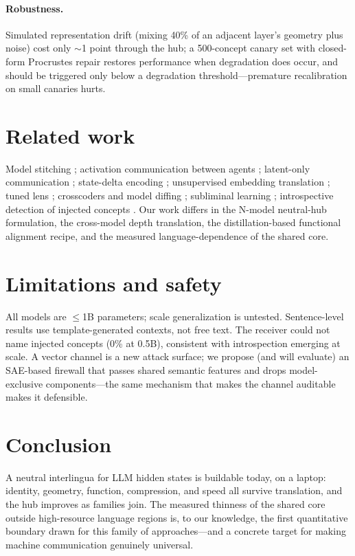 \documentclass[11pt]{article}
\begin{document}
\paragraph{Robustness.} Simulated representation drift (mixing 40\% of an
adjacent layer's geometry plus noise) cost only $\sim$1 point through the
hub; a 500-concept canary set with closed-form Procrustes repair restores
performance when degradation does occur, and should be triggered only below
a degradation threshold---premature recalibration on small canaries hurts.

\section{Related work}
Model stitching \cite{lenc2015,bansal2021}; activation communication between
agents \cite{ramesh2025activations}; latent-only communication
\cite{interlat2026}; state-delta encoding \cite{sde2025}; unsupervised
embedding translation \cite{jha2025vec2vec}; tuned lens \cite{belrose2023};
crosscoders and model diffing \cite{anthropic2025crosscoders}; subliminal
learning \cite{cloud2025subliminal}; introspective detection of injected
concepts \cite{lindsey2025introspection}. Our work differs in the N-model
neutral-hub formulation, the cross-model depth translation, the
distillation-based functional alignment recipe, and the measured
language-dependence of the shared core.

\section{Limitations and safety}
All models are $\leq$1B parameters; scale generalization is untested.
Sentence-level results use template-generated contexts, not free text.
The receiver could not name injected concepts (0\% at 0.5B), consistent with
introspection emerging at scale. A vector channel is a new attack surface;
we propose (and will evaluate) an SAE-based firewall that passes shared
semantic features and drops model-exclusive components---the same mechanism
that makes the channel auditable makes it defensible.

\section{Conclusion}
A neutral interlingua for LLM hidden states is buildable today, on a laptop:
identity, geometry, function, compression, and speed all survive
translation, and the hub improves as families join. The measured thinness of
the shared core outside high-resource language regions is, to our knowledge,
the first quantitative boundary drawn for this family of approaches---and a
concrete target for making machine communication genuinely universal.
\end{document}

